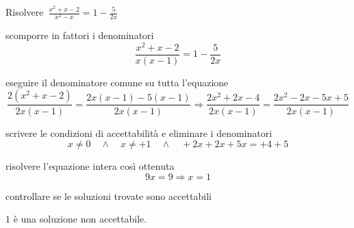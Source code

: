 \begin{exrig}
 \begin{esempio}
Risolvere~$\frac{x^{2}+x-2}{x^{2}-x}=1-\frac{5}{2x}$

\begin{enumerate*}
\item scomporre in fattori i denominatori
\[\frac{x^{2}+x-2}{x(x-1)}=1-\frac{5}{2x}\]

\item eseguire il denominatore comune su tutta l'equazione
\[\frac{2(x^{2}+x-2)}{2x(x-1)}=\frac{2x(x-1)-5(x-1)}{2x(x-1)}\Rightarrow
\frac{2x^{2}+2x-4}{2x(x-1)}=\frac{2x^2-2x-5x+5}{2x(x-1)}\]

\item scrivere le condizioni di accettabilità e eliminare i denominatori
\[x \neq 0 \quad \wedge \quad x \neq +1 \quad \wedge \quad +2x +2x +5x = +4 +5\]

\item risolvere l'equazione intera così ottenuta
\[9x = 9 \Rightarrow x=1\]

\item controllare se le soluzioni trovate sono accettabili

\centering $1$ è una soluzione non accettabile.

\end{enumerate*}

 \end{esempio}
 

\end{exrig}
